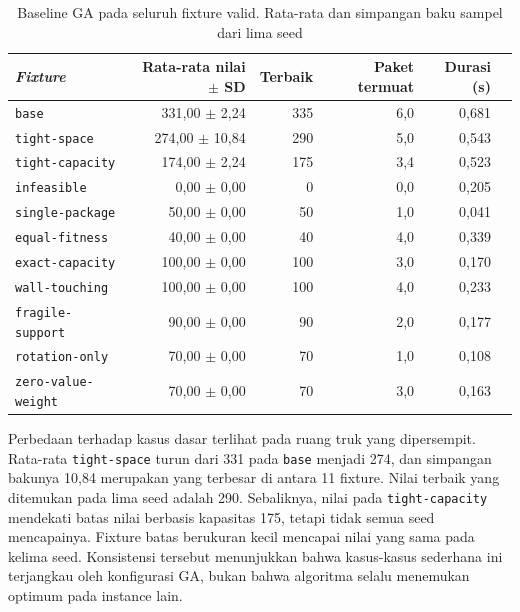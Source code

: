 \begin{table}[H]
    \centering
    \small
    \caption{Baseline GA pada seluruh fixture valid. Rata-rata dan simpangan baku sampel dari lima seed}
    \label{tab:ga-fixture-baseline}
    \begin{tabular}{@{}lrrrrr@{}}
        \toprule
        \textit{Fixture}           & Rata-rata nilai $\pm$ SD & Terbaik & Paket termuat & Durasi (s) \\
        \midrule
        \texttt{base}              & 331,00 $\pm$ 2,24        & 335     & 6,0           & 0,681      \\
        \texttt{tight-space}       & 274,00 $\pm$ 10,84       & 290     & 5,0           & 0,543      \\
        \texttt{tight-capacity}    & 174,00 $\pm$ 2,24        & 175     & 3,4           & 0,523      \\
        \texttt{infeasible}        & 0,00 $\pm$ 0,00          & 0       & 0,0           & 0,205      \\
        \texttt{single-package}    & 50,00 $\pm$ 0,00         & 50      & 1,0           & 0,041      \\
        \texttt{equal-fitness}     & 40,00 $\pm$ 0,00         & 40      & 4,0           & 0,339      \\
        \texttt{exact-capacity}    & 100,00 $\pm$ 0,00        & 100     & 3,0           & 0,170      \\
        \texttt{wall-touching}     & 100,00 $\pm$ 0,00        & 100     & 4,0           & 0,233      \\
        \texttt{fragile-support}   & 90,00 $\pm$ 0,00         & 90      & 2,0           & 0,177      \\
        \texttt{rotation-only}     & 70,00 $\pm$ 0,00         & 70      & 1,0           & 0,108      \\
        \texttt{zero-value-weight} & 70,00 $\pm$ 0,00         & 70      & 3,0           & 0,163      \\
        \bottomrule
    \end{tabular}
\end{table}

Perbedaan terhadap kasus dasar terlihat pada ruang truk yang dipersempit. Rata-rata \texttt{tight-space} turun dari 331 pada \texttt{base} menjadi 274, dan simpangan bakunya 10,84 merupakan yang terbesar di antara 11 fixture. Nilai terbaik yang ditemukan pada lima seed adalah 290. Sebaliknya, nilai pada \texttt{tight-capacity} mendekati batas nilai berbasis kapasitas 175, tetapi tidak semua seed mencapainya. Fixture batas berukuran kecil mencapai nilai yang sama pada kelima seed. Konsistensi tersebut menunjukkan bahwa kasus-kasus sederhana ini terjangkau oleh konfigurasi GA, bukan bahwa algoritma selalu menemukan optimum pada instance lain.

